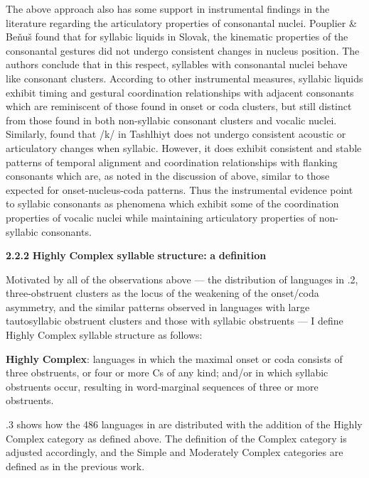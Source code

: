   The above approach also has some support in instrumental findings in the literature regarding the articulatory properties of consonantal nuclei. Pouplier \& Beňuš  found that for syllabic liquids in Slovak, the kinematic properties of the consonantal gestures did not undergo consistent changes in nucleus position. The authors conclude that in this respect, syllables with consonantal nuclei behave like consonant clusters. According to other instrumental measures, syllabic liquids exhibit timing and gestural coordination relationships with adjacent consonants which are reminiscent of those found in onset or coda clusters, but still distinct from those found in both non-syllabic consonant clusters and vocalic nuclei. Similarly, \citet{FougeronRidouane2008} found that /k/ in Tashlhiyt does not undergo consistent acoustic or articulatory changes when syllabic. However, it does exhibit consistent and stable patterns of temporal alignment and coordination relationships with flanking consonants which are, as noted in the discussion of \citet{GoldsteinEtAl2007} above, similar to those expected for onset-nucleus-coda patterns. Thus the instrumental evidence point to syllabic consonants as phenomena which exhibit some of the coordination properties of vocalic nuclei while maintaining articulatory properties of non-syllabic consonants.

\textbf{2.2.2} \textbf{Highly} \textbf{Complex} \textbf{syllable} \textbf{structure:} \textbf{a} \textbf{definition}

  Motivated by all of the observations above — the distribution of languages in .2, three-obstruent clusters as the locus of the weakening of the onset/coda asymmetry, and the similar patterns observed in languages with large tautosyllabic obstruent clusters and those with syllabic obstruents — I define Highly Complex syllable structure as follows:

\textbf{Highly} \textbf{Complex}: languages in which the maximal onset or coda consists of three obstruents, or four or more Cs of any kind; and/or in which syllabic obstruents occur, resulting in word-marginal sequences of three or more obstruents.

  .3 shows how the 486 languages in \citet{Maddieson2013a} are distributed with the addition of the Highly Complex category as defined above. The definition of the Complex category is adjusted accordingly, and the Simple and Moderately Complex categories are defined as in the previous work.


